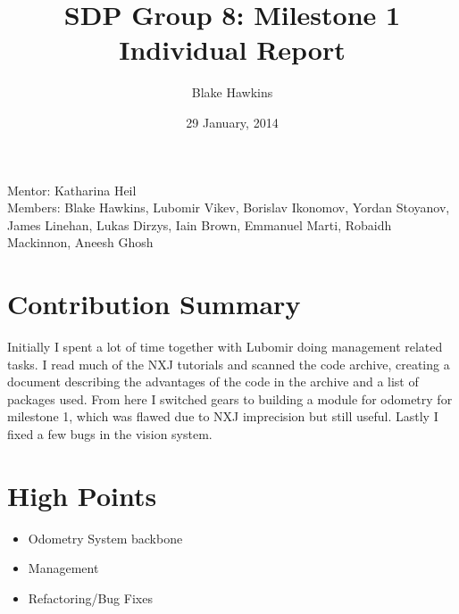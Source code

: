 \documentclass[a4paper,12pt]{article}
\title{SDP Group 8: Milestone 1 Individual Report} %
\author{Blake Hawkins} %
\date{29 January, 2014} %
\begin{document}
\maketitle %

\begin{center}
Mentor: Katharina Heil %
\\
Members: Blake Hawkins, %
Lubomir Vikev,
Borislav Ikonomov,
Yordan Stoyanov,
James Linehan,
Lukas Dirzys,
Iain Brown,
Emmanuel Marti,
Robaidh Mackinnon,
Aneesh Ghosh

\end{center}


\section{Contribution Summary}

Initially I spent a lot of time together with Lubomir doing management related tasks. I read much of the NXJ tutorials and scanned the code archive, creating a document describing the advantages of the code in the archive and a list of packages used. From here I switched gears to building a module for odometry for milestone 1, which was flawed due to NXJ imprecision but still useful. Lastly I fixed a few bugs in the vision system.
 

\section{High Points}

\begin{itemize}
\item Odometry System backbone
\item Management
\item Refactoring/Bug Fixes
\end{itemize}

\end{document}
